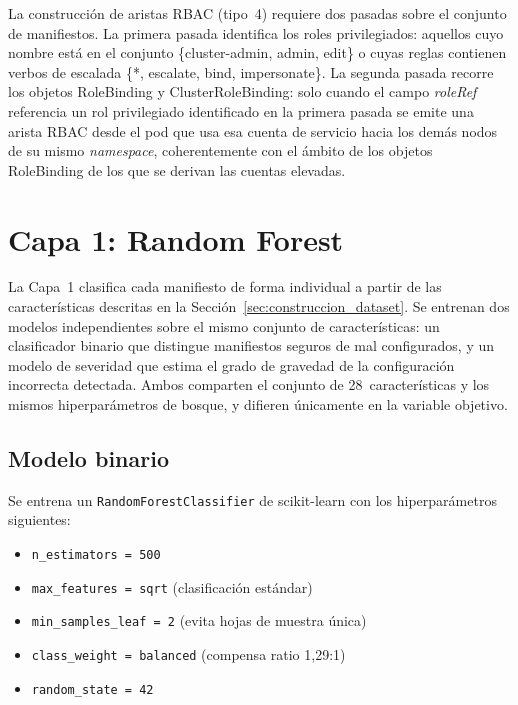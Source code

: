 La construcción de aristas \ac{RBAC} (tipo~4) requiere dos pasadas sobre el conjunto de
manifiestos. La primera pasada identifica los roles privilegiados: aquellos cuyo nombre
está en el conjunto \{cluster-admin, admin, edit\} o cuyas reglas contienen verbos de
escalada \{*, escalate, bind, impersonate\}. La segunda pasada recorre los objetos
RoleBinding y ClusterRoleBinding: solo cuando el campo
\textit{roleRef} referencia un rol privilegiado identificado en la primera pasada se
emite una arista \ac{RBAC} desde el pod que usa esa cuenta de servicio hacia los demás
nodos de su mismo \textit{namespace}, coherentemente con el ámbito de los objetos
RoleBinding de los que se derivan las cuentas elevadas.

\section{Capa 1: Random Forest}
\label{sec:capa1_diseno}

La Capa~1 clasifica cada manifiesto de forma individual a partir de las
características descritas en la Sección~\ref{sec:construccion_dataset}. Se entrenan dos modelos
independientes sobre el mismo conjunto de características: un clasificador
binario que distingue manifiestos seguros de mal configurados, y un modelo de
severidad que estima el grado de gravedad de la configuración incorrecta
detectada. Ambos comparten el conjunto de 28~características y los mismos
hiperparámetros de bosque, y difieren únicamente en la variable objetivo.

\subsection{Modelo binario}

Se entrena un \texttt{RandomForestClassifier} \citep{Breiman2001} de scikit-learn
\citep{Pedregosa2011} con los hiperparámetros siguientes:

\begin{itemize}
  \item \texttt{n\_estimators = 500}
  \item \texttt{max\_features = sqrt} (clasificación estándar)
  \item \texttt{min\_samples\_leaf = 2} (evita hojas de muestra única)
  \item \texttt{class\_weight = balanced} (compensa ratio 1,29:1)
  \item \texttt{random\_state = 42}
\end{itemize}

